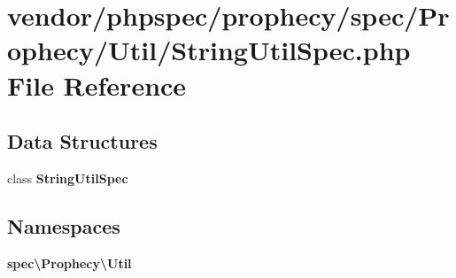 \section{vendor/phpspec/prophecy/spec/\+Prophecy/\+Util/\+String\+Util\+Spec.php File Reference}
\label{_string_util_spec_8php}
\subsection*{Data Structures}
\begin{DoxyCompactItemize}
\item 
class {\bf String\+Util\+Spec}
\end{DoxyCompactItemize}
\subsection*{Namespaces}
\begin{DoxyCompactItemize}
\item 
 {\bf spec\textbackslash{}\+Prophecy\textbackslash{}\+Util}
\end{DoxyCompactItemize}
